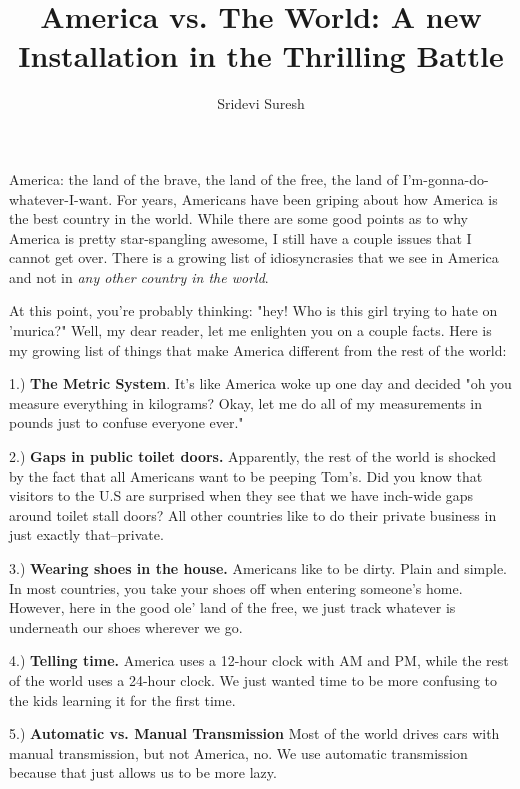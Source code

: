 \documentclass[14pt]{extarticle}
\title{America vs. The World: A new Installation in the Thrilling Battle}
\author{Sridevi Suresh}
\begin{document}
\maketitle 

America: the land of the brave, the land of the free, the land of I'm-gonna-do-whatever-I-want. For years, Americans have been griping about how America is the best country in the world. While there are some good points as to why America is pretty star-spangling awesome, I still have a couple issues that I cannot get over. There is a growing list of idiosyncrasies that we see in America and not in \textit{any other country in the world}. 

At this point, you're probably thinking: "hey! Who is this girl trying to hate on 'murica?" Well, my dear reader, let me enlighten you on a couple facts.  Here is my growing list of things that make America different from the rest of the world:

\vspace{5mm}
1.) \textbf{The Metric System}. It's like America woke up one day and decided "oh you measure everything in kilograms? Okay, let me do all of my measurements in pounds just to confuse everyone ever." 

\vspace{5mm}
2.) \textbf{Gaps in public toilet doors.} Apparently, the rest of the world is shocked by the fact that all Americans want to be peeping Tom's. Did you know that visitors to the U.S are surprised when they see that we have inch-wide gaps around toilet stall doors? All other countries like to do their private business in just exactly that--private. 

\vspace{5mm}
3.) \textbf{Wearing shoes in the house.} Americans like to be dirty. Plain and simple. In most countries, you take your shoes off when entering someone's home. However, here in the good ole' land of the free, we just track whatever is underneath our shoes wherever we go. 

\vspace{5mm}
4.) \textbf{Telling time.} America uses a 12-hour clock with AM and PM, while the rest of the world uses a 24-hour clock. We just wanted time to be more confusing to the kids learning it for the first time. 

\vspace{5mm}
5.) \textbf{Automatic vs. Manual Transmission} Most of the world drives cars with manual transmission, but not America, no. We use automatic transmission because that just allows us to be more lazy. 
\end{document}
